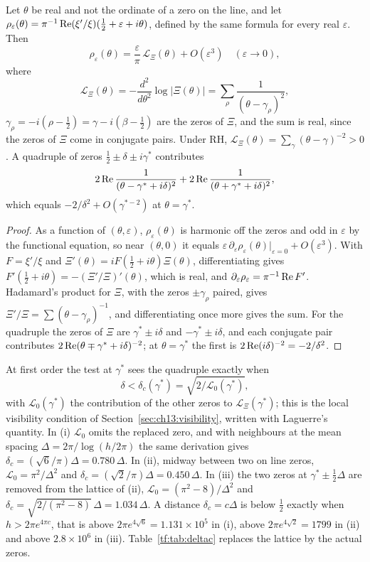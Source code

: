 \begin{proposition}\label{tf:prop:nearline}
Let $\theta$ be real and not the ordinate of a zero on the line, and let $\rho_\varepsilon(\theta)=\pi^{-1}\operatorname{Re}(\xi'/\xi)(\tfrac12+\varepsilon+i\theta)$, defined by the same formula for every real $\varepsilon$. Then
\[
\rho_\varepsilon(\theta)=\frac{\varepsilon}{\pi}\,\mathcal L_\Xi(\theta)+O(\varepsilon^3)\quad(\varepsilon\to0),
\]
where
\[
\mathcal L_\Xi(\theta)=-\frac{d^2}{d\theta^2}\log|\Xi(\theta)|=\sum_\rho\frac{1}{(\theta-\gamma_\rho)^2},
\]
$\gamma_\rho=-i(\rho-\tfrac12)=\gamma-i(\beta-\tfrac12)$ are the zeros of $\Xi$, and the sum is real, since the zeros of $\Xi$ come in conjugate pairs. Under RH, $\mathcal L_\Xi(\theta)=\sum_\gamma(\theta-\gamma)^{-2}>0$. A quadruple of zeros $\tfrac12\pm\delta\pm i\gamma^*$ contributes
\[
2\operatorname{Re}\frac{1}{(\theta-\gamma^*+i\delta)^2}+2\operatorname{Re}\frac{1}{(\theta+\gamma^*+i\delta)^2},
\]
which equals $-2/\delta^2+O(\gamma^{*-2})$ at $\theta=\gamma^*$.
\end{proposition}

\begin{proof}
As a function of $(\theta,\varepsilon)$, $\rho_\varepsilon(\theta)$ is harmonic off the zeros and odd in $\varepsilon$ by the functional equation, so near $(\theta,0)$ it equals $\varepsilon\,\partial_\varepsilon\rho_\varepsilon(\theta)|_{\varepsilon=0}+O(\varepsilon^3)$. With $F=\xi'/\xi$ and $\Xi'(\theta)=iF(\tfrac12+i\theta)\Xi(\theta)$, differentiating gives $F'(\tfrac12+i\theta)=-(\Xi'/\Xi)'(\theta)$, which is real, and $\partial_\varepsilon\rho_\varepsilon=\pi^{-1}\operatorname{Re} F'$. Hadamard's product for $\Xi$, with the zeros $\pm\gamma_\rho$ paired, gives $\Xi'/\Xi=\sum(\theta-\gamma_\rho)^{-1}$, and differentiating once more gives the sum. For the quadruple the zeros of $\Xi$ are $\gamma^*\pm i\delta$ and $-\gamma^*\pm i\delta$, and each conjugate pair contributes $2\operatorname{Re}(\theta\mp\gamma^*+i\delta)^{-2}$; at $\theta=\gamma^*$ the first is $2\operatorname{Re}(i\delta)^{-2}=-2/\delta^2$.
\end{proof}

At first order the test at $\gamma^*$ sees the quadruple exactly when
\[
\delta<\delta_c(\gamma^*)=\sqrt{2/\mathcal L_0(\gamma^*)},
\]
with $\mathcal L_0(\gamma^*)$ the contribution of the other zeros to $\mathcal L_\Xi(\gamma^*)$; this is the local visibility condition of Section~\ref{sec:ch13:visibility}, written with Laguerre's quantity. In (i) $\mathcal L_0$ omits the replaced zero, and with neighbours at the mean spacing $\Delta=2\pi/\log(h/2\pi)$ the same derivation gives $\delta_c=(\sqrt6/\pi)\Delta=0.780\,\Delta$. In (ii), midway between two on line zeros, $\mathcal L_0=\pi^2/\Delta^2$ and $\delta_c=(\sqrt2/\pi)\Delta=0.450\,\Delta$. In (iii) the two zeros at $\gamma^*\pm\tfrac12\Delta$ are removed from the lattice of (ii), $\mathcal L_0=(\pi^2-8)/\Delta^2$ and $\delta_c=\sqrt{2/(\pi^2-8)}\,\Delta=1.034\,\Delta$. A distance $\delta_c=c\Delta$ is below $\tfrac12$ exactly when $h>2\pi e^{4\pi c}$, that is above $2\pi e^{4\sqrt6}=1.131\times10^5$ in (i), above $2\pi e^{4\sqrt2}=1799$ in (ii) and above $2.8\times10^{6}$ in (iii). Table~\ref{tf:tab:deltac} replaces the lattice by the actual zeros.

